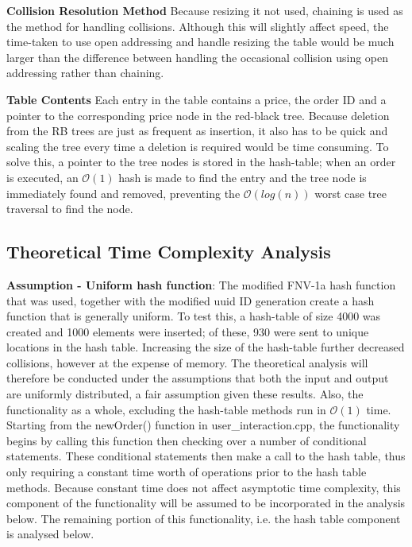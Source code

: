 \documentclass[11p]{article}
\def\nl{\newline}
\begin{document}
\textbf{Collision Resolution Method} \nl
Because resizing it not used, chaining is used as the method for handling collisions. Although this will slightly affect speed, the time-taken to use open addressing and handle resizing the table would be much larger than the difference between handling the occasional collision using open addressing rather than chaining.  \nl

\textbf{Table Contents} \nl
Each entry in the table contains a price, the order ID and a pointer to the corresponding price node in the red-black tree. Because deletion from the RB trees are just as frequent as insertion, it also has to be quick and scaling the tree every time a deletion is required would be time consuming. To solve this, a pointer to the tree nodes is stored in the hash-table; when an order is executed, an $\mathcal{O}(1)$ hash is made to find the entry and the tree node is immediately found and removed, preventing the $\mathcal{O}(log(n))$ worst case tree traversal to find the node. \nl


\subsection{Theoretical Time Complexity Analysis}
\textbf{Assumption - Uniform hash function}:\nl
The modified FNV-1a hash function that was used, together with the modified uuid ID generation create a hash function that is generally uniform. To test this, a hash-table of size 4000 was created and 1000 elements were inserted; of these, 930 were sent to unique locations in the hash table. Increasing the size of the hash-table further decreased collisions, however at the expense of memory. The theoretical analysis will therefore be conducted under the assumptions that both the input and output are uniformly distributed, a fair assumption given these results. \bigbreak 
Also, the functionality as a whole, excluding the hash-table methods run in $\mathcal{O}(1)$ time. Starting from the newOrder() function in user\_interaction.cpp, the functionality begins by calling this function then checking over a number of conditional statements. These conditional statements then make a call to the hash table, thus only requiring a constant time worth of operations prior to the hash table methods. Because constant time does not affect asymptotic time complexity, this component of the functionality will be assumed to be incorporated in the analysis below. The remaining portion of this functionality, i.e. the hash table component is analysed below. 
\end{document}
